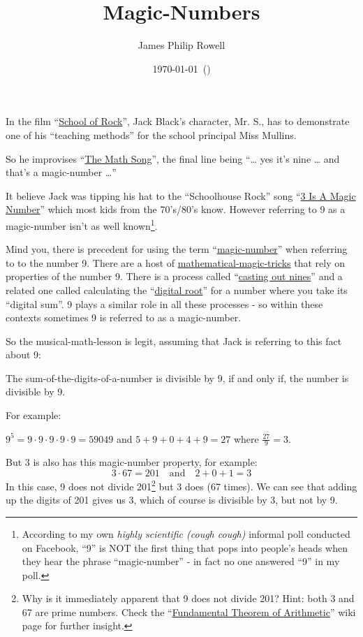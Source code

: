 \documentclass{article}
\title{\vspace{-1.5cm}Magic-Numbers}
\author{James Philip Rowell}
\date{\vspace{-0.5cm}\footnotesize\today\ (\jprVersion)} %
\newenvironment{jprIn}{\begin{adjustwidth}{2em}{}}{\end{adjustwidth}}
\begin{document}
\maketitle

In the film ``\href{https://en.wikipedia.org/wiki/School_of_Rock}{School
of Rock}'', Jack Black's character, Mr. S.,
has to demonstrate one of his ``teaching methods'' for the school 
principal Miss Mullins.

So he improvises ``\href{https://www.youtube.com/watch?v=aa8U0nL-KXg}{The
Math Song}'', the final line being
``\dots{}\twonotes{} yes it's nine \twonotes{}\dots{} and that's
a magic-number \twonotes{}\dots{}''

It believe Jack was tipping his hat
to the ``Schoolhouse Rock'' song ``\href{https://youtu.be/aU4pyiB-kq0}{3
Is A Magic Number}''
which most kids from the 70's/80's know.
However referring to 9 as a magic-number isn't
as well known\footnote{According to my own \emph{highly scientific (cough cough)}
informal poll conducted on Facebook, %
``9'' is NOT the first thing that pops into people's heads when they
hear the phrase ``magic-number'' - in fact no one answered ``9'' in my poll.}.

Mind you, there is precedent
for using the term ``\href{http://mathworld.wolfram.com/MagicNumber.html}{magic-number}''
when referring to to the number 9.
There are a host of
\href{http://mathematics-in-europe.eu/?p=144}{mathematical-magic-tricks}
that rely on properties of the number 9.
There is a process called
``\href{https://en.wikipedia.org/wiki/Casting_out_nines}{casting out nines}'' and a related one 
called calculating the
``\href{http://mathworld.wolfram.com/DigitalRoot.html}{digital root}''
for a number where you take its ``digital sum''. 9 plays a similar role
in all these processes - so within these contexts sometimes 9
is referred to as a magic-number.

So the musical-math-lesson is legit, assuming that Jack is referring to this fact about 9:
\begin{center}
The sum-of-the-digits-of-a-number is divisible by 9,
\break
if and only if,
\break
the number
is divisible by 9.
\end{center}

For example:
\begin{jprIn}
$9^5=9\cdot{}9\cdot{}9\cdot{}9\cdot{}9=59049$
\quad and \quad $5+9+0+4+9=27$ \quad where \quad $\frac{27}{9} = 3$.
\end{jprIn}

But 3 is also has this magic-number property, for example:
\[ 3\cdot{}67=201 \quad\text{and}\quad 2+0+1=3\]
In this case, 9 does not divide 201\footnote{Why is it immediately
apparent that 9 does not divide 201? Hint: both 3 and 67 are prime numbers.
Check the ``\href{https://en.wikipedia.org/wiki/Fundamental_theorem_of_arithmetic}{Fundamental
Theorem of Arithmetic}'' wiki page for further insight.}
but 3 does (67 times).
We can see that adding up the digits of 201 gives us 3,
which of course is divisible by 3, but not by 9.
\end{document}
